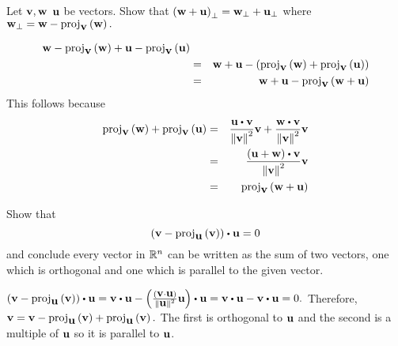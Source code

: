 \begin{enumialphparenastyle}
\begin{ex} \label{perp-linear} Let $\mbox{\bf v},\mbox{\bf w}$ $\mbox{\bf u}$ be vectors. Show
that $\left(\mbox{\bf w}+\mbox{\bf u}\right) _{\perp }=\mbox{\bf w}_{\perp }+\mbox{\bf u}_{\perp }$
 where $\mbox{\bf w}_{\perp }=\mbox{\bf w}-\mbox{\rm proj}_{\mbox{\bf v}}\left(\mbox{\bf w}\right) .$
\begin{sol}
\begin{eqnarray*}
\mbox{\bf w}-\mbox{\rm proj}_{\mbox{\bf v}}\left(\mbox{\bf w}\right) +\mbox{\bf u}- \mbox{\rm proj}_{\mbox{\bf v}}\left(\mbox{\bf u}\right) \\
&=&\mbox{\bf w}+\mbox{\bf u}-\left(\mbox{\rm proj}_{\mbox{\bf v}}\left(\mbox{\bf w}\right) +\mbox{\rm proj}_{\mbox{\bf v}}\left(\mbox{\bf u}\right) \right) \\
&=&\mbox{\bf w}+\mbox{\bf u}-\mbox{\rm proj}_{\mbox{\bf v}}\left(\mbox{\bf w}+\mbox{\bf u}\right) 
\end{eqnarray*}
This follows because 
\begin{eqnarray*}
\func{proj}_{\vect{v}}\tup{\vect{w}} +\func{proj}_{\vect{v}}\tup{
\vect{u}} &=& \frac{\vect{u}\dotprod \vect{v}}{\norm{\vect{v}} ^{2}}\vect{v}+
\frac{\vect{w}\dotprod \vect{v}}{\norm{\vect{v}} ^{2}}\vect{v} \\
&=& \frac{\tup{\vect{u}+\vect{w}} \dotprod \vect{v}}{\norm{\vect{v}
} ^{2}}\vect{v} \\
&=& \func{proj}_{\vect{v}}\tup{\vect{w}+\vect{u}}
\end{eqnarray*}
\end{sol}
\end{ex}

\begin{ex} Show that
\begin{equation*}
 \tup{\vect{v}-\func{proj}_{\vect{u}
}\tup{\vect{v}} } \dotprod \vect{u}=0
\end{equation*}
and conclude every vector in $\mathbb{R}^{n}$ can be written as the sum of
two vectors, one which is orthogonal and one which is parallel to the
given vector.
\begin{sol}
$\tup{\vect{v}-\func{proj}_{\vect{u}}\tup{\vect{v}} } \dotprod \vect{u} =  \vect{v} \dotprod \vect{u} -\tup{\frac{\tup{\vect{v}\cdot\vect{u}} }{\norm{\vect{u}} ^{2}}\vect{u} } \dotprod \vect{u} = \vect{v} \dotprod \vect{u} - \vect{v} \dotprod \vect{u} =0.$ Therefore, $\mbox{\bf v} = \mbox{\bf v} - \mbox{\rm proj}_{\mbox{\bf u}}\left(\mbox{\bf v}\right) + \mbox{\rm proj}_{\mbox{\bf u}}\left(\mbox{\bf v}\right).$ The first is orthogonal to $\mbox{\bf u}$ and the second is a multiple
of $\mbox{\bf u}$ so it is parallel to $\mbox{\bf u}$.
\end{sol}
\end{ex}

\end{enumialphparenastyle}
